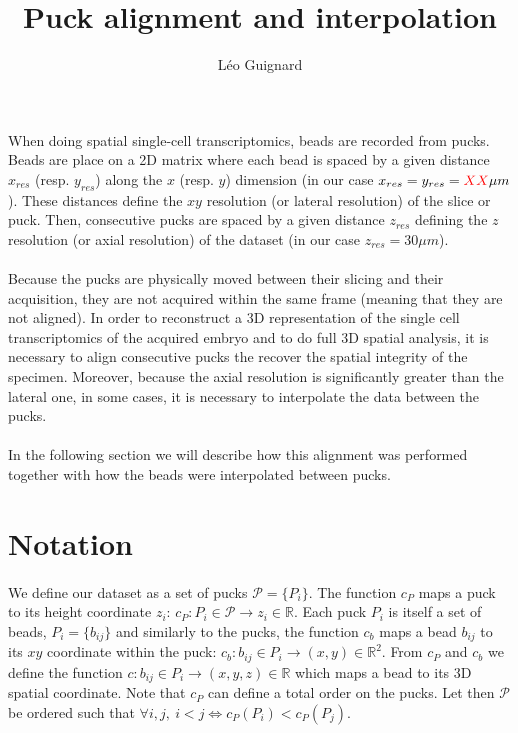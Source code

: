 \documentclass[10pt,a4paper]{article}
\author{L\'eo Guignard}
\title{Puck alignment and interpolation}
\begin{document}
\maketitle
\paragraph{}When doing spatial single-cell transcriptomics, beads are recorded from pucks.
Beads are place on a 2D matrix where each bead is spaced by a given distance $x_{res}$ (resp.
$y_{res}$) along the $x$ (resp.
$y$) dimension (in our case $x_{res}=y_{res}={\color{red}XX} \mu m$).
These distances define the $xy$ resolution (or lateral resolution) of the slice or puck.
Then, consecutive pucks are spaced by a given distance $z_{res}$ defining the $z$ resolution (or axial resolution) of the dataset (in our case $z_{res}=30\mu m$).
\paragraph{}Because the pucks are physically moved between their slicing and their acquisition, they are not acquired within the same frame (meaning that they are not aligned).
In order to reconstruct a 3D representation of the single cell transcriptomics of the acquired embryo and to do full 3D spatial analysis, it is necessary to align consecutive pucks the recover the spatial integrity of the specimen.
Moreover, because the axial resolution is significantly greater than the lateral one, in some cases, it is necessary to interpolate the data between the pucks.
\paragraph{}In the following section we will describe how this alignment was performed together with how the beads were interpolated between pucks.
\section{Notation}
\paragraph{}We define our dataset as a set of pucks \(\mathcal{P}=\{P_i\}\).
The function $c_P$ maps a puck to its height coordinate $z_i$: \(c_P: P_i\in \mathcal{P} \rightarrow z_i \in \mathbb{R}\).
Each puck $P_i$ is itself a set of beads, \(P_i=\{b_{ij}\}\) and similarly to the pucks, the function \(c_b\) maps a bead \(b_{ij}\) to its \(xy\) coordinate within the puck: \(c_b:b_{ij}\in P_i\rightarrow (x,y)\in \mathbb{R}^2\).
From \(c_P\) and \(c_b\) we define the function \(c:b_{ij}\in P_i\rightarrow (x,y,z)\in\mathbb{R}\) which maps a bead to its 3D spatial coordinate.
Note that \(c_P\) can define a total order on the pucks.
Let then \(\mathcal{P}\) be ordered such that \(\forall i,j,~i<j\iff c_P(P_i)<c_P(P_j)\).
%
\end{document}
